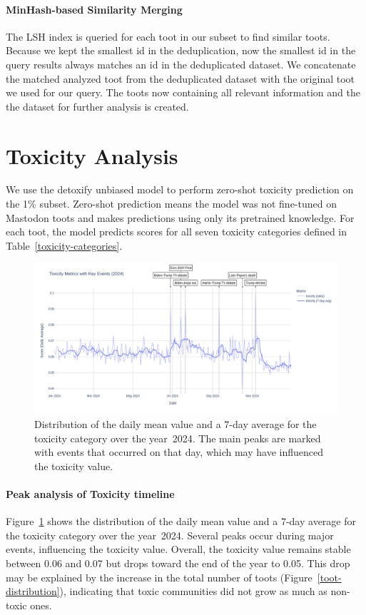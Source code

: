 \paragraph{MinHash-based Similarity Merging}\label{step:merge}
The LSH index is queried for each toot in our subset to find similar toots. Because we kept the smallest id in the deduplication, now the smallest id in the query results always matches an id in the deduplicated dataset. We concatenate the matched analyzed toot from the deduplicated dataset with the original toot we used for our query. The toots now containing all relevant information and the the dataset for further analysis is created.

\section{Toxicity Analysis}\label{step:toxicity}
We use the detoxify unbiased model to perform zero-shot toxicity prediction on the 1\% subset. Zero-shot prediction means the model was not fine-tuned on Mastodon toots and makes predictions using only its pretrained knowledge. For each toot, the model predicts scores for all seven toxicity categories defined in Table~\ref{toxicity-categories}.

\begin{figure}[tb]
    \centering
    \includegraphics[width=\textwidth]{../material/toxicity_2024.png}
    \caption{Distribution of the daily mean value and a 7-day average for the toxicity category over the year~2024. The main peaks are marked with events that occurred on that day, which may have influenced the toxicity value.}
    \label{toxicity-2024}
\end{figure}

\paragraph{Peak analysis of Toxicity timeline} 
Figure~\ref{toxicity-2024} shows the distribution of the daily mean value and a 7-day average for the toxicity category over the year~2024. Several peaks occur during major events, influencing the toxicity value. Overall, the toxicity value remains stable between 0.06 and 0.07 but drops toward the end of the year to 0.05. This drop may be explained by the increase in the total number of toots (Figure~\ref{toot-distribution}), indicating that toxic communities did not grow as much as non-toxic ones.

